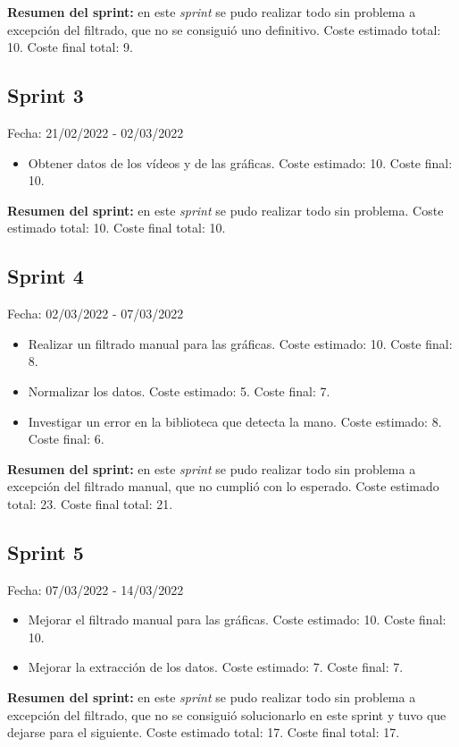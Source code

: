 \textbf{Resumen del sprint:} en este \textit{sprint} se pudo realizar todo sin problema a excepción del filtrado, que no se consiguió uno definitivo. Coste estimado total: 10. Coste final total: 9.

\subsection{Sprint 3}
Fecha: 21/02/2022 - 02/03/2022
\begin{itemize}
	\item Obtener datos de los vídeos y de las gráficas. Coste estimado: 10. Coste final: 10. 
\end{itemize}

\textbf{Resumen del sprint:} en este \textit{sprint} se pudo realizar todo sin problema. Coste estimado total: 10. Coste final total: 10.

\subsection{Sprint 4}
Fecha: 02/03/2022 - 07/03/2022
\begin{itemize}
	\item Realizar un filtrado manual para las gráficas. Coste estimado: 10. Coste final: 8. 
	\item Normalizar los datos. Coste estimado: 5. Coste final: 7.
	\item Investigar un error en la biblioteca que detecta la mano. Coste estimado: 8. Coste final: 6.
\end{itemize}

\textbf{Resumen del sprint:} en este \textit{sprint} se pudo realizar todo sin problema a excepción del filtrado manual, que no cumplió con lo esperado. Coste estimado total: 23. Coste final total: 21.

\subsection{Sprint 5}
Fecha: 07/03/2022 - 14/03/2022
\begin{itemize}
	\item Mejorar el filtrado manual para las gráficas. Coste estimado: 10. Coste final: 10.
	\item Mejorar la extracción de los datos. Coste estimado: 7. Coste final: 7.
\end{itemize}

\textbf{Resumen del sprint:} en este \textit{sprint} se pudo realizar todo sin problema a excepción del filtrado, que no se consiguió solucionarlo en este sprint y tuvo que dejarse para el siguiente. Coste estimado total: 17. Coste final total: 17.

